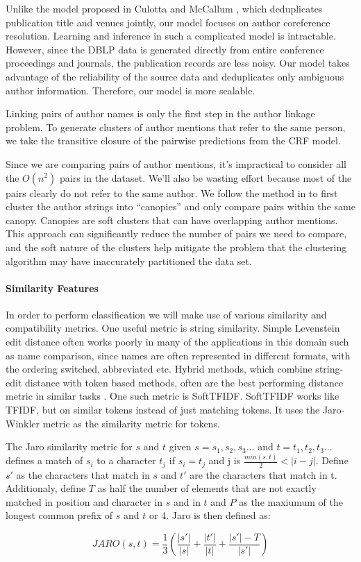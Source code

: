 \documentclass[twocolumn,letterpaper]{article}
\begin{document}
Unlike the model proposed in Culotta and McCallum
\cite{Culotta05aconditional}, which deduplicates publication title and
venues jointly, our model focuses on author coreference resolution.
Learning and inference in such a complicated model is intractable.
However, since the DBLP data is generated directly from entire
conference proceedings and journals, the publication records are less
noisy.  Our model takes advantage of the reliability of the source
data and deduplicates only ambiguous author information.  Therefore,
our model is more scalable.

Linking pairs of author names is only the first step in the author
linkage problem.  To generate clusters of author mentions that refer
to the same person, we take the transitive closure of the pairwise
predictions from the CRF model.

Since we are comparing pairs of author mentions, it's impractical to
consider all the $O(n^2)$ pairs in the dataset.  We'll also be wasting
effort because most of the pairs clearly do not refer to the same
author.  We follow the method in \cite{McCallum00} to first cluster
the author strings into ``canopies'' and only compare pairs within the
same canopy.  Canopies are soft clusters that can have overlapping
author mentions.  This approach can significantly reduce the number of
pairs we need to compare, and the soft nature of the clusters help
mitigate the problem that the clustering algorithm may have
inaccurately partitioned the data set.


\paragraph{Similarity Features} %
\label{par:similarity_features}
In order to perform classification we will make use of various similarity and compatibility metrics. One useful metric is string similarity. Simple Levenstein edit distance often works poorly in many of the applications in this domain such as name comparison, since names are often represented in different formats, with the ordering switched, abbreviated etc. Hybrid methods, which combine string-edit distance with token based methods, often are the best performing distance metric in similar tasks \cite{cohen2003comparison}. One such metric is SoftTFIDF. SoftTFIDF works like TFIDF, but on similar tokens instead of just matching tokens. It uses the Jaro-Winkler metric as the similarity metric for tokens. 

The Jaro similarity metric for $s$ and $t$ given $s= s_1,s_2,s_3...$ and $t= t_1,t_2,t_3...$ defines a match of $s_i$ to a character $t_j$ if $s_i=t_j$ and j is $\frac{min(s,t)}{2} < |i-j|$. Define $s'$ as the characters that match in $s$ and $t'$ are the characters that match in t. Additionaly, define $T$ as half the number of elements that are not exactly matched in position and character in $s$ and in $t$ and $P$ as the maxiumum of the longest common prefix of $s$ and $t$ or 4. Jaro is then defined as:
\begin{center}
\[
	JARO(s,t) = \frac{1}{3}\left(\frac{|s'|}{|s|}+\frac{|t'|}{|t|}+\frac{|s'|-T}{|s'|}\right)
\]
\end{center}
\end{document}
